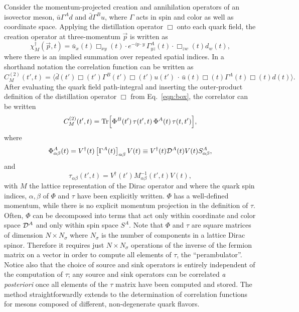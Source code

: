 Consider the momentum-projected creation and annihilation
operators of an isovector meson, $\bar{u} \Gamma^A d$ and
$\bar{d} \Gamma^B u$, where $\Gamma$ acts in spin and color as well as
coordinate space. Applying the distillation operator $\Box$ onto each
quark field, the creation operator at three-momentum $\vec{p}$ is written as
\begin{equation}
\chi^\dagger_M(\vec{p},t)
  = \bar{u}_x(t) \Box_{xy}(t) \cdot e^{-i p\cdot y}\, \Gamma^A_{yz}(t) \cdot \Box_{zw}(t) d_w(t),
\label{eqn:meson_quark_op}
\end{equation}
where there is an implied summation over repeated spatial indices. In a shorthand notation the correlation function can be written as
\begin{equation}
  C^{(2)}_M(t',t) = \Big\langle \bar{d}(t')\Box(t')\Gamma^B(t')\Box(t')u(t')\,\cdot\,
                      \bar{u}(t)\Box(t)\Gamma^A(t)\Box(t) d(t)
    \Big\rangle.
\end{equation}
After evaluating the quark field path-integral and inserting the outer-product
definition of the distillation operator $\Box$ from Eq.~\ref{eqn:box}, the
correlator can be written
\begin{equation}
  C^{(2)}_M(t',t) = \mbox{Tr} \Bigl[
      \Phi^B(t') \,
      \tau(t',t) \,\Phi^A(t) \, \tau(t,t') \Bigr],
\end{equation}
where
\begin{equation}
  \Phi^A_{\alpha\beta}(t) = V^\dagger(t) \left[ \Gamma^A(t) \right]_{\alpha\beta} V(t)
  \equiv V^\dagger(t) {\cal D}^A(t) V(t) S^A_{\alpha\beta} ,
\label{eqn:meson_op}
\end{equation}
and
\begin{equation}
  \tau_{\alpha\beta }(t',t) = V^\dagger(t') M^{-1}_{\alpha\beta}(t',t) V(t),
\label{eqn:peram}
\end{equation}
with $M$ the lattice representation of the Dirac operator
and where the quark spin indices, $\alpha,\beta$ of $\Phi$ and $\tau$ have been
explicitly written. $\Phi$ has a well-defined momentum, while there is no
explicit momentum projection in the definition of $\tau$. Often, $\Phi$ can be
decomposed into terms that act only within coordinate and color space ${\cal
D}^A$ and only within spin space $S^{A}$. Note that $\Phi$ and $\tau$ are
square matrices of dimension $N \times N_\sigma$ where $N_\sigma$ is the number
of components in a lattice Dirac spinor. Therefore it requires just
$N \times N_\sigma$ operations of the inverse of the fermion matrix on a
vector in order to compute all elements of $\tau$, the ``perambulator''.
Notice also that the choice of source and sink operators is entirely
independent of the computation of $\tau$; any source and sink operators can be
correlated {\it a posteriori} once all elements of the $\tau$ matrix have been
computed and stored. The method straightforwardly extends to the determination
of correlation functions for mesons composed of different, non-degenerate
quark flavors.

